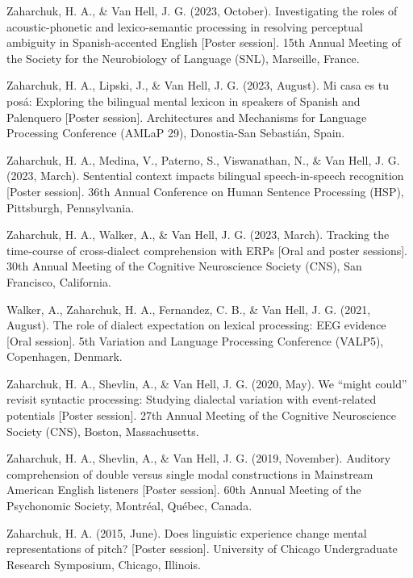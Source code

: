 \documentclass[11pt,a4paper,]{awesome-cv}
\newlength{\cslhangindent}
\newenvironment{CSLReferences}[2] %
 {\begin{list}{}{%
  \setlength{\itemindent}{0pt}
  \setlength{\leftmargin}{0pt}
  \setlength{\parsep}{0pt}
  \ifodd #1
   \setlength{\leftmargin}{\cslhangindent}
   \setlength{\itemindent}{-1\cslhangindent}
  \fi
  \setlength{\itemsep}{#2\baselineskip}}}
 {\end{list}}
\begin{document}
\begin{CSLReferences}{1}{0}
Zaharchuk, H. A., \& Van Hell, J. G. (2023, October). Investigating the
roles of acoustic-phonetic and lexico-semantic processing in resolving
perceptual ambiguity in Spanish-accented English {[}Poster session{]}.
15th Annual Meeting of the Society for the Neurobiology of Language
(SNL), Marseille, France.

Zaharchuk, H. A., Lipski, J., \& Van Hell, J. G. (2023, August). Mi casa
es tu posá: Exploring the bilingual mental lexicon in speakers of
Spanish and Palenquero {[}Poster session{]}. Architectures and
Mechanisms for Language Processing Conference (AMLaP 29), Donostia-San
Sebastián, Spain.

Zaharchuk, H. A., Medina, V., Paterno, S., Viswanathan, N., \& Van Hell,
J. G. (2023, March). Sentential context impacts bilingual
speech-in-speech recognition {[}Poster session{]}. 36th Annual
Conference on Human Sentence Processing (HSP), Pittsburgh, Pennsylvania.

Zaharchuk, H. A., Walker, A., \& Van Hell, J. G. (2023, March). Tracking
the time-course of cross-dialect comprehension with ERPs {[}Oral and
poster sessions{]}. 30th Annual Meeting of the Cognitive Neuroscience
Society (CNS), San Francisco, California.

Walker, A., Zaharchuk, H. A., Fernandez, C. B., \& Van Hell, J. G.
(2021, August). The role of dialect expectation on lexical processing:
EEG evidence {[}Oral session{]}. 5th Variation and Language Processing
Conference (VALP5), Copenhagen, Denmark.

Zaharchuk, H. A., Shevlin, A., \& Van Hell, J. G. (2020, May). We
{``might could''} revisit syntactic processing: Studying dialectal
variation with event-related potentials {[}Poster session{]}. 27th
Annual Meeting of the Cognitive Neuroscience Society (CNS), Boston,
Massachusetts.

Zaharchuk, H. A., Shevlin, A., \& Van Hell, J. G. (2019, November).
Auditory comprehension of double versus single modal constructions in
Mainstream American English listeners {[}Poster session{]}. 60th Annual
Meeting of the Psychonomic Society, Montréal, Québec, Canada.

Zaharchuk, H. A. (2015, June). Does linguistic experience change mental
representations of pitch? {[}Poster session{]}. University of Chicago
Undergraduate Research Symposium, Chicago, Illinois.

\end{CSLReferences}
\end{document}
